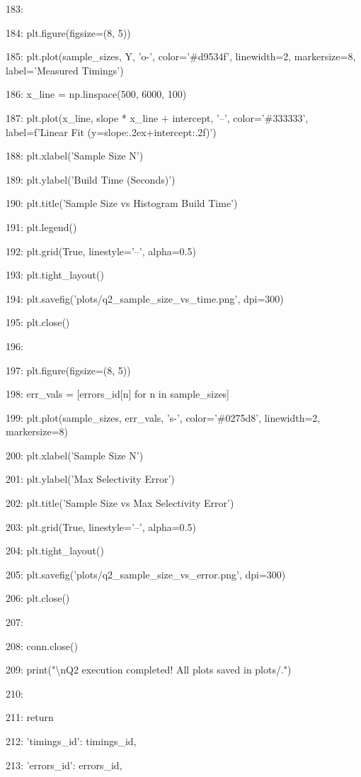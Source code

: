 \documentclass[11pt,a4paper]{article}
\begin{document}
{{{183:

184:     plt.figure(figsize=(8, 5))

185:     plt.plot(sample\_sizes, Y, 'o-', color='\#d9534f', linewidth=2, markersize=8, label='Measured Timings')

186:     x\_line = np.linspace(500, 6000, 100)

187:     plt.plot(x\_line, slope * x\_line + intercept, '--', color='\#333333', label=f'Linear Fit (y={slope:.2e}x+{intercept:.2f})')

188:     plt.xlabel('Sample Size N')

189:     plt.ylabel('Build Time (Seconds)')

190:     plt.title('Sample Size vs Histogram Build Time')

191:     plt.legend()

192:     plt.grid(True, linestyle='--', alpha=0.5)

193:     plt.tight\_layout()

194:     plt.savefig('plots/q2\_sample\_size\_vs\_time.png', dpi=300)

195:     plt.close()

196:

197:     plt.figure(figsize=(8, 5))

198:     err\_vals = [errors\_id[n] for n in sample\_sizes]

199:     plt.plot(sample\_sizes, err\_vals, 's-', color='\#0275d8', linewidth=2, markersize=8)

200:     plt.xlabel('Sample Size N')

201:     plt.ylabel('Max Selectivity Error')

202:     plt.title('Sample Size vs Max Selectivity Error')

203:     plt.grid(True, linestyle='--', alpha=0.5)

204:     plt.tight\_layout()

205:     plt.savefig('plots/q2\_sample\_size\_vs\_error.png', dpi=300)

206:     plt.close()

207:

208:     conn.close()

209:     print("\textbackslash{}nQ2 execution completed! All plots saved in plots/.")

210:

211:     return {

212:         'timings\_id': timings\_id,

213:         'errors\_id': errors\_id,

}}}}
\end{document}
